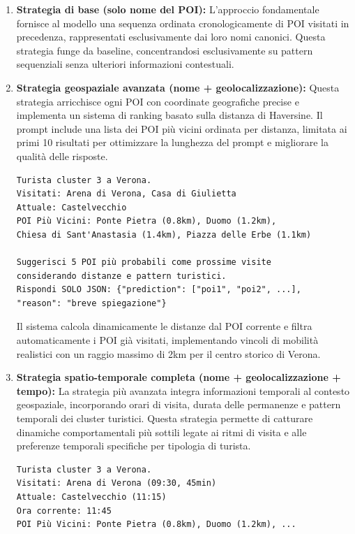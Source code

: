 \begin{enumerate}

\item \textbf{Strategia di base (solo nome del POI):} L'approccio fondamentale fornisce al modello una sequenza ordinata cronologicamente di POI visitati in precedenza, rappresentati esclusivamente dai loro nomi canonici. Questa strategia funge da baseline, concentrandosi esclusivamente su pattern sequenziali senza ulteriori informazioni contestuali.

\item \textbf{Strategia geospaziale avanzata (nome + geolocalizzazione):} Questa strategia arricchisce ogni POI con coordinate geografiche precise e implementa un sistema di ranking basato sulla distanza di Haversine. Il prompt include una lista dei POI più vicini ordinata per distanza, limitata ai primi 10 risultati per ottimizzare la lunghezza del prompt e migliorare la qualità delle risposte.

\begin{center}
\begin{lstlisting}[language=text, caption=Esempio di Prompt Geospaziale, captionpos=b]
Turista cluster 3 a Verona.
Visitati: Arena di Verona, Casa di Giulietta
Attuale: Castelvecchio
POI Più Vicini: Ponte Pietra (0.8km), Duomo (1.2km), 
Chiesa di Sant'Anastasia (1.4km), Piazza delle Erbe (1.1km)

Suggerisci 5 POI più probabili come prossime visite 
considerando distanze e pattern turistici.
Rispondi SOLO JSON: {"prediction": ["poi1", "poi2", ...], 
"reason": "breve spiegazione"}
\end{lstlisting}
\end{center}

Il sistema calcola dinamicamente le distanze dal POI corrente e filtra automaticamente i POI già visitati, implementando vincoli di mobilità realistici con un raggio massimo di 2km per il centro storico di Verona.

\item \textbf{Strategia spatio-temporale completa (nome + geolocalizzazione + tempo):} La strategia più avanzata integra informazioni temporali al contesto geospaziale, incorporando orari di visita, durata delle permanenze e pattern temporali dei cluster turistici. Questa strategia permette di catturare dinamiche comportamentali più sottili legate ai ritmi di visita e alle preferenze temporali specifiche per tipologia di turista.

\begin{center}
\begin{lstlisting}[language=text, caption=Esempio di Prompt Spatio-temporale, captionpos=b]
Turista cluster 3 a Verona.
Visitati: Arena di Verona (09:30, 45min)
Attuale: Castelvecchio (11:15)
Ora corrente: 11:45
POI Più Vicini: Ponte Pietra (0.8km), Duomo (1.2km), ...


\end{lstlisting}
\end{center}
\end{enumerate}
